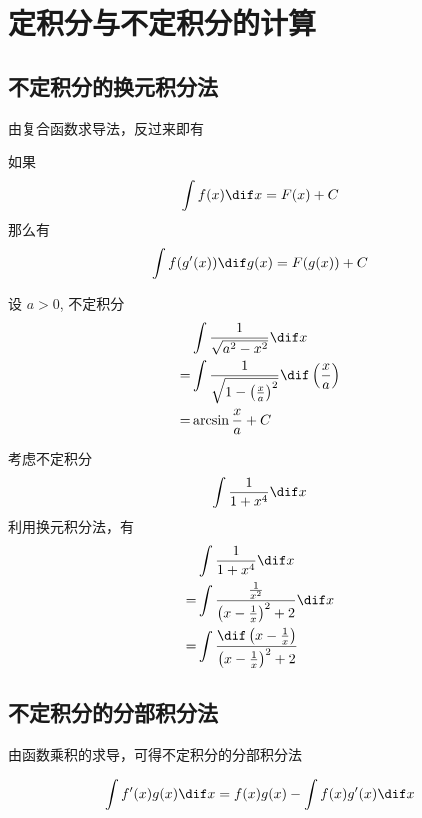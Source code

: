
\section{定积分与不定积分的计算}
\label{sec:computation-of-definite-and-indefinite-integral}

\subsection{不定积分的换元积分法}
\label{sec:indefinite-integration-by-substitution}

由复合函数求导法，反过来即有
\begin{theorem}[不定积分的换元积分法]
    如果
    \[ \int f(x) \dif x = F(x)+C \]
    那么有
    \[ \int f(g'(x)) \dif g(x) = F(g(x)) + C \]
\end{theorem}

\begin{example}
  设 $a>0$, 不定积分
  \begin{align*}
      & \int \frac{1}{\sqrt{a^2-x^2}} \dif x \\
     = &  \int \frac{1}{\sqrt{1- \left( \frac{x}{a} \right)^2}} \dif \left( \frac{x}{a} \right) \\
     = & \arcsin \frac{x}{a} + C
  \end{align*}

\end{example}

\begin{example}
    考虑不定积分
    \[ \int \frac{1}{1+x^4} \dif x \]
    利用换元积分法，有
    \begin{align*}
        & \int \frac{1}{1+x^4} \dif x \\
        = & \int \frac{\frac{1}{x^2}}{\left( x - \frac{1}{x} \right)^2+2} \dif x \\
        = & \int \frac{\dif \left( x - \frac{1}{x} \right)}{\left( x - \frac{1}{x} \right)^2+2}
    \end{align*}
\end{example}

\subsection{不定积分的分部积分法}
\label{sec:indefinite-integration-by-partial}
由函数乘积的求导，可得不定积分的分部积分法
\begin{theorem}
    \[ \int f'(x)g(x) \dif x = f(x)g(x) - \int f(x)g'(x) \dif x \]
\end{theorem}

